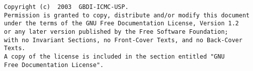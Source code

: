 \vspace{5cm}

{
\footnotesize
\begin{verbatim}
Copyright (c)  2003  GBDI-ICMC-USP.
Permission is granted to copy, distribute and/or modify this document
under the terms of the GNU Free Documentation License, Version 1.2
or any later version published by the Free Software Foundation;
with no Invariant Sections, no Front-Cover Texts, and no Back-Cover Texts.
A copy of the license is included in the section entitled "GNU
Free Documentation License".
\end{verbatim}
}